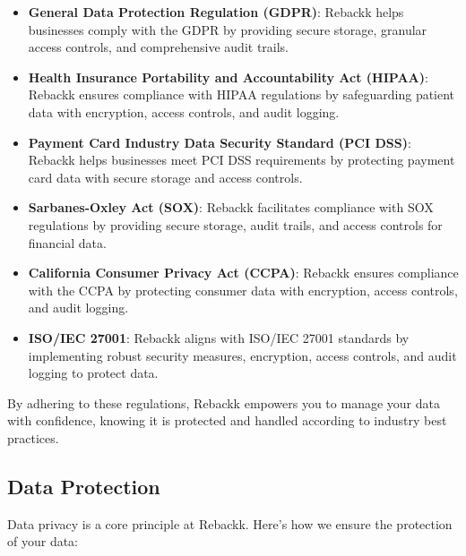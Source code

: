 \documentclass[12pt]{article}
\begin{document}
\begin{itemize}
    \item \textbf{General Data Protection Regulation (GDPR)}: Rebackk helps businesses comply with the GDPR by providing secure storage, granular access controls, and comprehensive audit trails.
    \item \textbf{Health Insurance Portability and Accountability Act (HIPAA)}: Rebackk ensures compliance with HIPAA regulations by safeguarding patient data with encryption, access controls, and audit logging.
    \item \textbf{Payment Card Industry Data Security Standard (PCI DSS)}: Rebackk helps businesses meet PCI DSS requirements by protecting payment card data with secure storage and access controls.
    \item \textbf{Sarbanes-Oxley Act (SOX)}: Rebackk facilitates compliance with SOX regulations by providing secure storage, audit trails, and access controls for financial data.
    \item \textbf{California Consumer Privacy Act (CCPA)}: Rebackk ensures compliance with the CCPA by protecting consumer data with encryption, access controls, and audit logging.
    \item \textbf{ISO/IEC 27001}: Rebackk aligns with ISO/IEC 27001 standards by implementing robust security measures, encryption, access controls, and audit logging to protect data.
\end{itemize}

By adhering to these regulations, Rebackk empowers you to manage your data with confidence, knowing it is protected and handled according to industry best practices.

\subsection{Data Protection}
Data privacy is a core principle at Rebackk. Here's how we ensure the protection of your data:
\end{document}
